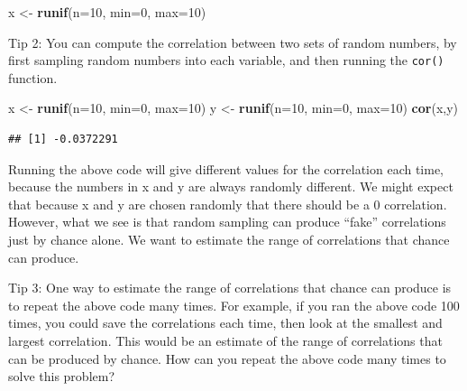 \documentclass[
]{book}
\newenvironment{Shaded}{\begin{snugshade}}{\end{snugshade}}
\newcommand{\AttributeTok}[1]{\textcolor[rgb]{0.13,0.29,0.53}{#1}}
\newcommand{\DecValTok}[1]{\textcolor[rgb]{0.00,0.00,0.81}{#1}}
\newcommand{\FunctionTok}[1]{\textcolor[rgb]{0.13,0.29,0.53}{\textbf{#1}}}
\newcommand{\NormalTok}[1]{#1}
\newcommand{\OtherTok}[1]{\textcolor[rgb]{0.56,0.35,0.01}{#1}}
\begin{document}
\begin{Shaded}
\begin{Highlighting}[]
\NormalTok{x }\OtherTok{\textless{}{-}} \FunctionTok{runif}\NormalTok{(}\AttributeTok{n=}\DecValTok{10}\NormalTok{, }\AttributeTok{min=}\DecValTok{0}\NormalTok{, }\AttributeTok{max=}\DecValTok{10}\NormalTok{)}
\end{Highlighting}
\end{Shaded}

Tip 2: You can compute the correlation between two sets of random numbers, by first sampling random numbers into each variable, and then running the \texttt{cor()} function.

\begin{Shaded}
\begin{Highlighting}[]
\NormalTok{x }\OtherTok{\textless{}{-}} \FunctionTok{runif}\NormalTok{(}\AttributeTok{n=}\DecValTok{10}\NormalTok{, }\AttributeTok{min=}\DecValTok{0}\NormalTok{, }\AttributeTok{max=}\DecValTok{10}\NormalTok{)}
\NormalTok{y }\OtherTok{\textless{}{-}} \FunctionTok{runif}\NormalTok{(}\AttributeTok{n=}\DecValTok{10}\NormalTok{, }\AttributeTok{min=}\DecValTok{0}\NormalTok{, }\AttributeTok{max=}\DecValTok{10}\NormalTok{)}
\FunctionTok{cor}\NormalTok{(x,y)}
\end{Highlighting}
\end{Shaded}

\begin{verbatim}
## [1] -0.0372291
\end{verbatim}

Running the above code will give different values for the correlation each time, because the numbers in x and y are always randomly different. We might expect that because x and y are chosen randomly that there should be a 0 correlation. However, what we see is that random sampling can produce ``fake'' correlations just by chance alone. We want to estimate the range of correlations that chance can produce.

Tip 3: One way to estimate the range of correlations that chance can produce is to repeat the above code many times. For example, if you ran the above code 100 times, you could save the correlations each time, then look at the smallest and largest correlation. This would be an estimate of the range of correlations that can be produced by chance. How can you repeat the above code many times to solve this problem?
\end{document}
